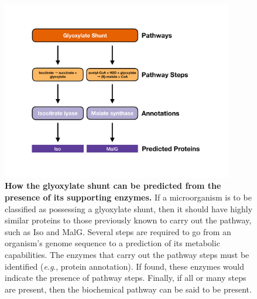 \begin{figure}[!ht]
  \centering
	\includegraphics[width=0.9\textwidth]{media/pathway_analysis_steps.pdf}
\caption[How the glyoxylate shunt can be predicted from the presence of its 
supporting enzymes.]{\textbf{How the glyoxylate shunt can be predicted from the 
presence of its supporting enzymes.}  If a microorganism is to be classified as 
possessing a glyoxylate shunt, then it should have highly similar proteins to 
those previously known to carry out the pathway, such as Iso and MalG. Several 
steps are required to go from an organism’s genome sequence to a prediction of 
its metabolic capabilities. The enzymes that carry out the pathway steps must be 
identified (\textit{e}.\textit{g}., protein annotation). If found, these enzymes 
would indicate the presence of pathway steps. Finally, if all or many steps are 
present, then the biochemical pathway can be said to be present.}
	 \label{fig:pathway-analysis-steps}
\end{figure}

